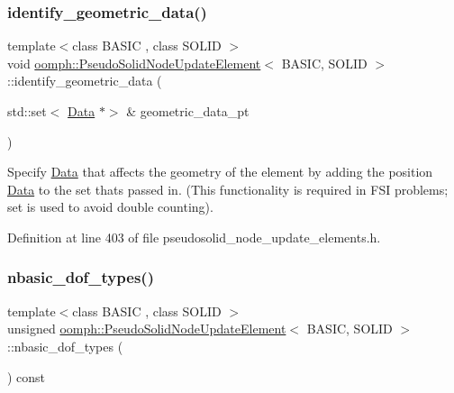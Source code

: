 \subsubsection{\texorpdfstring{identify\+\_\+geometric\+\_\+data()}{identify\_geometric\_data()}}
{\footnotesize\ttfamily template$<$class B\+A\+S\+IC , class S\+O\+L\+ID $>$ \\
void \hyperlink{classoomph_1_1PseudoSolidNodeUpdateElement}{oomph\+::\+Pseudo\+Solid\+Node\+Update\+Element}$<$ B\+A\+S\+IC, S\+O\+L\+ID $>$\+::identify\+\_\+geometric\+\_\+data (\begin{DoxyParamCaption}\item[{std\+::set$<$ \hyperlink{classoomph_1_1Data}{Data} $\ast$$>$ \&}]{geometric\+\_\+data\+\_\+pt }\end{DoxyParamCaption})\hspace{0.3cm}{\ttfamily [inline]}}



Specify \hyperlink{classoomph_1_1Data}{Data} that affects the geometry of the element by adding the position \hyperlink{classoomph_1_1Data}{Data} to the set that\textquotesingle{}s passed in. (This functionality is required in F\+SI problems; set is used to avoid double counting). 



Definition at line 403 of file pseudosolid\+\_\+node\+\_\+update\+\_\+elements.\+h.

\mbox{\label{classoomph_1_1PseudoSolidNodeUpdateElement_a6fbeab78f1f6ebe9fc76625d88009e61}} 
\subsubsection{\texorpdfstring{nbasic\+\_\+dof\+\_\+types()}{nbasic\_dof\_types()}}
{\footnotesize\ttfamily template$<$class B\+A\+S\+IC , class S\+O\+L\+ID $>$ \\
unsigned \hyperlink{classoomph_1_1PseudoSolidNodeUpdateElement}{oomph\+::\+Pseudo\+Solid\+Node\+Update\+Element}$<$ B\+A\+S\+IC, S\+O\+L\+ID $>$\+::nbasic\+\_\+dof\+\_\+types (\begin{DoxyParamCaption}{ }\end{DoxyParamCaption}) const\hspace{0.3cm}{\ttfamily [inline]}}



